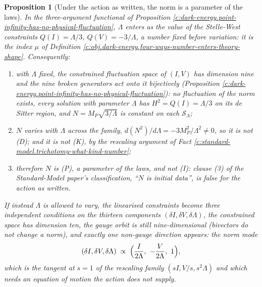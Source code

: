 \documentclass[11pt]{article}
\newtheorem{proposition}[theorem]{Proposition}
\theoremstyle{definition}
\theoremstyle{plain}
\newcommand{\changedmark}[2]{\marginpar{\raggedright\scriptsize\color{#1}#2}}
\begin{document}
\begin{proposition}[Under the action as written, the norm is a parameter of the laws]\label{c:dark-energy.under-action-written-norm-parameter-laws}
\changedmark{gray}{reworded}
In the three-argument functional of Proposition \ref{c:dark-energy.point-infinity-has-no-physical-fluctuation}, $\Lambda$ enters as the value of the Stelle-West constraints $Q(I) = \Lambda/3$, $Q(V) = -3/\Lambda$, a number fixed before variation: it is the index $\mu$ of Definition \ref{c:obj.dark-energy.four-ways-number-enters-theory-shape}. Consequently:
\begin{enumerate}
\item[(i)] with $\Lambda$ fixed, the constrained fluctuation space of $(I, V)$ has dimension nine and the nine broken generators act onto it bijectively (Proposition \ref{c:dark-energy.point-infinity-has-no-physical-fluctuation}): no fluctuation of the norm exists, every solution with parameter $\Lambda$ has $H^2 = Q(I) = \Lambda/3$ on its de Sitter region, and $N = M_P\sqrt{3/\Lambda}$ is constant on each $\mathcal{S}_\Lambda$;
\item[(ii)] $N$ varies with $\Lambda$ across the family, $d(N^2)/d\Lambda = -3M_P^2/\Lambda^2 \neq 0$, so it is not (D); and it is not (K), by the rescaling argument of Fact \ref{c:standard-model.trichotomy-what-kind-number};
\item[(iii)] therefore $N$ is (P), a parameter of the laws, and not (I): clause (3) of the Standard-Model paper's classification, ``$N$ is initial data'', is false for the action as written.
\end{enumerate}
If instead $\Lambda$ is allowed to vary, the linearised constraints become three independent conditions on the thirteen components $(\delta I, \delta V, \delta\Lambda)$, the constrained space has dimension ten, the gauge orbit is still nine-dimensional (bivectors do not change a norm), and exactly one non-gauge direction appears: the norm mode
\[
(\delta I, \delta V, \delta\Lambda) \;\propto\; \Bigl(\frac{I}{2\Lambda},\ -\frac{V}{2\Lambda},\ 1\Bigr),
\]
which is the tangent at $s = 1$ of the rescaling family $(sI, V/s, s^2\Lambda)$ and which needs an equation of motion the action does not supply.
\end{proposition}
\end{document}
